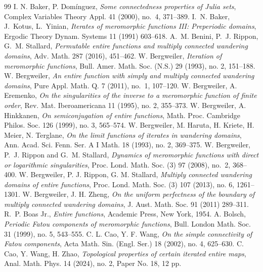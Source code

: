 \documentclass[11pt,a4paper]{article}
\begin{document}
\begin{thebibliography}{99}
	 I. N. Baker, P. Dom\'inguez, \emph{ Some connectedness properties of Julia sets}, Complex Variables Theory Appl. 41 (2000), no.~4, 371--389.
 	I.~N. Baker, J.~Kotus, L.~Yinian, \emph{Iterates of meromorphic
	functions {III}: Preperiodic domains}, Ergodic Theory Dynam. Systems 11 (1991) 603--618.
 A.~M. Benini, P.~J. Rippon, G.~M. Stallard,  \emph{Permutable entire functions and multiply connected wandering domains}, Adv. Math. 287 (2016), 451--462.
	 W. Bergweiler, \emph{Iteration of meromorphic functions}, Bull. Amer. Math. Soc. (N.S.) 29 (1993), no. 2, 151–188.
	W. Bergweiler,  \emph{An entire function with simply and multiply connected wandering domains}, Pure Appl. Math. Q. {  7} (2011), no.~1, 107--120.
	W. Bergweiler,  A. Eremenko, \emph{On the singularities of the inverse to a meromorphic function of finite order}, Rev. Mat. Iberoamericana 11 (1995), no. 2, 355–373.
	W. Bergweiler,  A. Hinkkanen, \emph{On semiconjugation of entire functions}, Math. Proc. Cambridge Philos. Soc. 126 (1999), no. 3, 565–574.
	W. Bergweiler, M. Haruta, H.  Kriete, H. Meier, N. Terglane, \emph{On the limit functions of iterates in wandering domains}, Ann. Acad. Sci. Fenn. Ser. A I Math. 18 (1993), no. 2, 369–375.
	W. Bergweiler, P.~J. Rippon and G.~M. Stallard, \emph{Dynamics of meromorphic functions with direct or logarithmic singularities}, Proc. Lond. Math. Soc. (3) 97 (2008), no.~2, 368--400.
	W. Bergweiler, P. J.  Rippon,   G. M. Stallard, \emph{Multiply connected wandering domains of entire functions}, Proc. Lond. Math. Soc. (3) 107 (2013), no. 6, 1261–1301.
	W. Bergweiler, J. H. Zheng, \emph{On the uniform perfectness of the boundary of multiply connected
		wandering domains},  J. Aust. Math. Soc. 91 (2011) 289–311.
		 R.~P. Boas Jr., {\it Entire functions}, Academic Press, New York, 1954.
	A. Bolsch, \emph{Periodic Fatou components of meromorphic functions}, Bull. London Math. Soc. 31 (1999), no. 5, 543–555.
	C. L. Cao, Y. F. Wang, \emph{On the simple connectivity of Fatou components}, Acta Math. Sin. (Engl. Ser.) 18 (2002), no. 4, 625–630.
	C. Cao, Y. Wang, H. Zhao, \emph{Topological properties of certain iterated entire maps}, Anal. Math. Phys. 14 (2024), no. 2, Paper No. 18, 12 pp.

\end{thebibliography}
\end{document}
